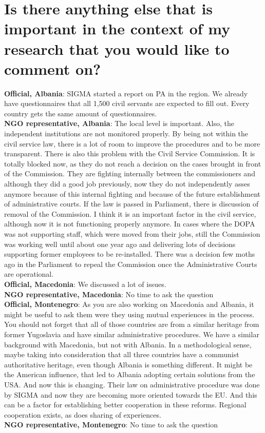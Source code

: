 \section{Is there anything else that is important in the context of my research that you would like to comment on?}
\textbf{Official, Albania}: SIGMA started a report on PA in the region. We already have questionnaires that all 1,500 civil servants are expected to fill out. Every country gets the same amount of questionnaires.  \\
\textbf{NGO representative, Albania}: The local level is important. Also, the independent institutions are not monitored properly. By being not within the civil service law, there is a lot of room to improve the procedures and to be more transparent. There is also this problem with the Civil Service Commission. It is totally blocked now, as they do not reach a decision on the cases brought in front of the Commission. They are fighting internally between the commissioners and although they did a good job previously, now they do not independently asses anymore because of this internal fighting and because of the future establishment of administrative courts. If the law is passed in Parliament, there is discussion of removal of the Commission. I think it is an important factor in the civil service, although now it is not functioning properly anymore. In cases where the DOPA was not supporting staff, which were moved from their jobs, still the Commission was working well until about one year ago and delivering lots of decisions supporting former employees to be re-installed. There was a decision few moths ago in the Parliament to repeal the Commission once the Administrative Courts are operational.  \\
\textbf{Official, Macedonia}: We discussed a lot of issues. \\
\textbf{NGO representative, Macedonia}: No time to ask the question\\
\textbf{Official, Montenegro}: As you are also working on Macedonia and Albania, it might be useful to ask them were they using mutual experiences in the process. You should not forget that all of those countries are from a similar heritage from former Yugoslavia and have similar administrative procedures. We have a similar background with Macedonia, but not with Albania. In a methodological sense, maybe taking into consideration that all three countries have a communist authoritative heritage, even though Albania is something different. It might be the American influence, that led to Albania adopting certain solutions from the USA. And now this is changing. Their law on administrative procedure was done by SIGMA and now they are becoming more oriented towards the EU. And this can be a factor for establishing better cooperation in these reforms. Regional cooperation exists, as does sharing of experiences. \\
\textbf{NGO representative, Montenegro}: No time to ask the question